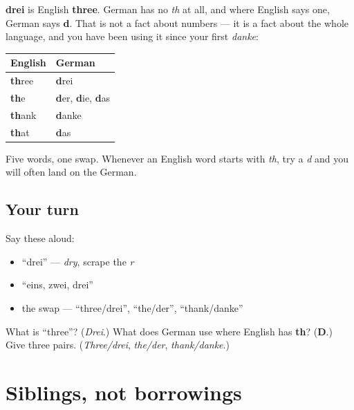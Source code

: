 \begin{cousinweb}
\textbf{drei} is English \textbf{three}. German has no \emph{th} at all, and where English says one, German says \textbf{d}. That is not a fact about numbers — it is a fact about the whole language, and you have been using it since your first \emph{danke}:

\noindent
\begin{tabularx}{\linewidth}{@{}>{\raggedright\arraybackslash}X>{\raggedright\arraybackslash}X@{}}
\toprule
\textbf{English} & \textbf{German} \\
\midrule
\textbf{th}ree & \textbf{d}rei \\
\textbf{th}e & \textbf{d}er, \textbf{d}ie, \textbf{d}as \\
\textbf{th}ank & \textbf{d}anke \\
\textbf{th}at & \textbf{d}as \\
\bottomrule
\end{tabularx}

Five words, one swap. Whenever an English word starts with \emph{th}, try a \emph{d} and you will often land on the German.
\end{cousinweb}

\subsection*{Your turn}
Say these aloud:

\begin{itemize}
\raggedright
  \item \textquotedblleft{}drei\textquotedblright{} — \emph{dry}, scrape the \emph{r}
  \item \textquotedblleft{}eins, zwei, drei\textquotedblright{}
  \item the swap — \textquotedblleft{}three/drei\textquotedblright{}, \textquotedblleft{}the/der\textquotedblright{}, \textquotedblleft{}thank/danke\textquotedblright{}
\end{itemize}

\begin{tcolorbox}[breakable,colback=teal!4,colframe=teal!35!black,title={Before you move on}]
What is \textquotedblleft{}three\textquotedblright{}? (\emph{Drei}.) What does German use where English has \textbf{th}? (\textbf{D}.) Give three pairs. (\emph{Three/drei}, \emph{the/der}, \emph{thank/danke}.)
\end{tcolorbox}
\section[(siblings, not borrowings)]{Siblings, not borrowings}

